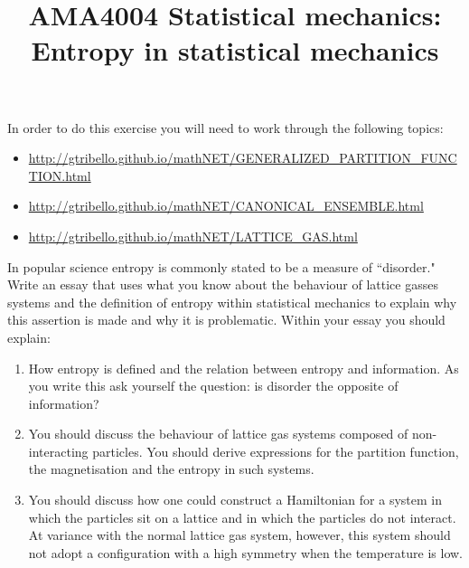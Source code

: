 \documentclass[a4paper]{article}
\title{
\vspace{-3em}
\begin{tcolorbox}
\Huge\sffamily AMA4004 Statistical mechanics: Entropy in statistical mechanics   
\end{tcolorbox}
\vspace{-3em}
}
\date{}
\begin{document}
\maketitle

In order to do this exercise you will need to work through the following topics:

\begin{itemize}
\item \href{http://gtribello.github.io/mathNET/GENERALIZED\_PARTITION\_FUNCTION.html}{http://gtribello.github.io/mathNET/GENERALIZED\_PARTITION\_FUNCTION.html}
\item \href{http://gtribello.github.io/mathNET/CANONICAL\_ENSEMBLE.html}{http://gtribello.github.io/mathNET/CANONICAL\_ENSEMBLE.html}
\item \href{http://gtribello.github.io/mathNET/LATTICE\_GAS.html}{http://gtribello.github.io/mathNET/LATTICE\_GAS.html}
\end{itemize}

In popular science entropy is commonly stated to be a measure of ``disorder."  Write an essay that uses what you know about the behaviour of lattice gasses systems and the definition of entropy within statistical mechanics to explain why this assertion is made and why it is problematic.  Within your essay you should explain:

\begin{enumerate}
\item How entropy is defined and the relation between entropy and information.  As you write this ask yourself the question: is disorder the opposite of information?
\item You should discuss the behaviour of lattice gas systems composed of non-interacting particles. You should derive expressions for the partition function, the magnetisation and the entropy in such systems.
\item You should discuss how one could construct a Hamiltonian for a system in which the particles sit on a lattice and in which the particles do not interact.  At variance with the normal lattice gas system, however, this system should not adopt a configuration with a high symmetry when the temperature is low.
\end{enumerate}
\end{document}
